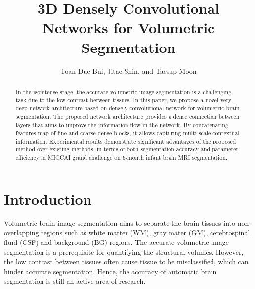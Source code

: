 \documentclass{llncs}
\begin{document}
\mainmatter  %


\title{3D Densely Convolutional Networks for Volumetric Segmentation}
\author{Toan Duc Bui, Jitae Shin, and Taesup Moon}

\maketitle

\begin{abstract}
In the isointense stage, the accurate volumetric image segmentation is a challenging task due to the low contrast between tissues. In this paper, we propose a novel very deep network architecture based on densely convolutional network for volumetric brain segmentation. The proposed network architecture provides a dense connection between layers that aims to improve the information flow in the network. By concatenating features map of fine and coarse dense blocks, it allows capturing multi-scale contextual information. Experimental results demonstrate significant advantages of the proposed method over existing methods, in terms of both segmentation accuracy and parameter efficiency in  MICCAI grand challenge on 6-month infant brain MRI segmentation. 
\end{abstract}

\section{Introduction}

Volumetric brain image segmentation aims to separate the brain tissues into non-overlapping regions such as white matter (WM), gray mater (GM), cerebrospinal fluid (CSF) and background (BG) regions. The accurate volumetric image segmentation is a prerequisite for quantifying the structural volumes. However, the low contrast between tissues often cause tissue to be misclassified, which can hinder accurate segmentation. Hence, the accuracy of automatic brain segmentation is still an active area of research. 
\end{document}

